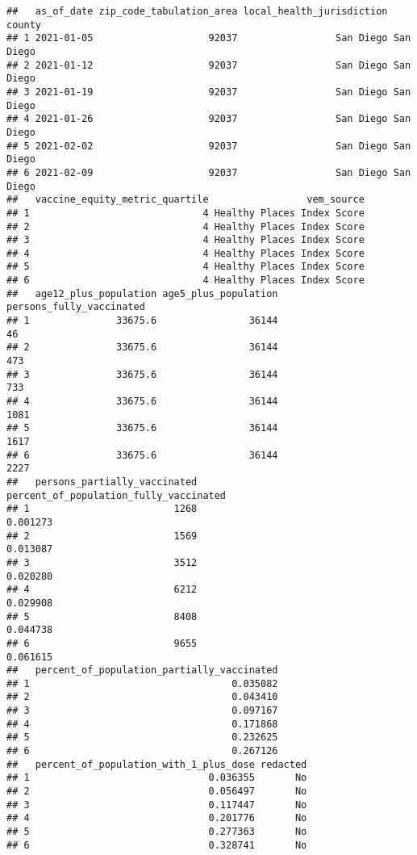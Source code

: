 \documentclass[
]{article}
\begin{document}
\begin{verbatim}
##   as_of_date zip_code_tabulation_area local_health_jurisdiction    county
## 1 2021-01-05                    92037                 San Diego San Diego
## 2 2021-01-12                    92037                 San Diego San Diego
## 3 2021-01-19                    92037                 San Diego San Diego
## 4 2021-01-26                    92037                 San Diego San Diego
## 5 2021-02-02                    92037                 San Diego San Diego
## 6 2021-02-09                    92037                 San Diego San Diego
##   vaccine_equity_metric_quartile                 vem_source
## 1                              4 Healthy Places Index Score
## 2                              4 Healthy Places Index Score
## 3                              4 Healthy Places Index Score
## 4                              4 Healthy Places Index Score
## 5                              4 Healthy Places Index Score
## 6                              4 Healthy Places Index Score
##   age12_plus_population age5_plus_population persons_fully_vaccinated
## 1               33675.6                36144                       46
## 2               33675.6                36144                      473
## 3               33675.6                36144                      733
## 4               33675.6                36144                     1081
## 5               33675.6                36144                     1617
## 6               33675.6                36144                     2227
##   persons_partially_vaccinated percent_of_population_fully_vaccinated
## 1                         1268                               0.001273
## 2                         1569                               0.013087
## 3                         3512                               0.020280
## 4                         6212                               0.029908
## 5                         8408                               0.044738
## 6                         9655                               0.061615
##   percent_of_population_partially_vaccinated
## 1                                   0.035082
## 2                                   0.043410
## 3                                   0.097167
## 4                                   0.171868
## 5                                   0.232625
## 6                                   0.267126
##   percent_of_population_with_1_plus_dose redacted
## 1                               0.036355       No
## 2                               0.056497       No
## 3                               0.117447       No
## 4                               0.201776       No
## 5                               0.277363       No
## 6                               0.328741       No
\end{verbatim}
\end{document}
